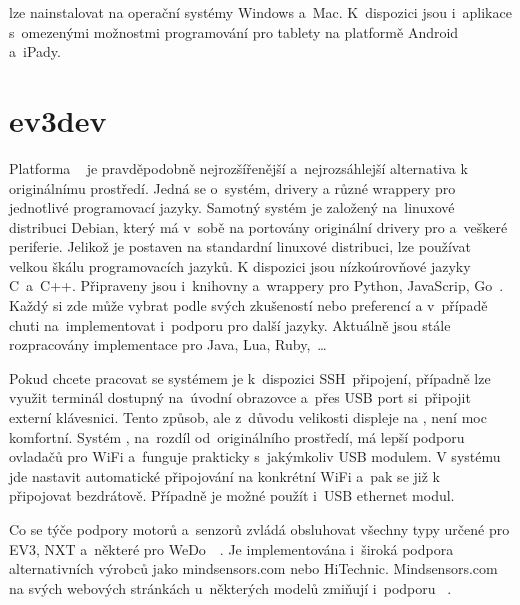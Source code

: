 \legoSW{} lze nainstalovat na operační systémy Windows a~Mac. K~dispozici jsou i~aplikace s~omezenými možnostmi programování pro tablety na platformě Android a~iPady.


\section{ev3dev}
\label{lego-ev3dev}

Platforma \evThreeDev{}~\cite{legoMindstormsEV3_ev3dev} je pravděpodobně nejrozšířenější a~nejrozsáhlejší alternativa k originálnímu \lego{} prostředí.
Jedná se o~systém, drivery a různé wrappery pro jednotlivé programovací jazyky. 
Samotný systém je založený na~linuxové distribuci Debian, který má v~sobě na portovány originální \lego{} drivery pro \EVbrick{} a~veškeré periferie.
Jelikož je \evThreeDev{} postaven na standardní linuxové distribuci, lze používat velkou škálu programovacích jazyků. 
K dispozici jsou nízkoúrovňové jazyky C~a~C++. 
Připraveny jsou i~knihovny a~wrappery pro Python, JavaScrip, Go~\cite{legoMindstormsEV3_ev3dev-prog-lang}. 
Každý si zde může vybrat podle svých zkušeností nebo preferencí a v~případě chuti na~implementovat i~podporu pro další jazyky. 
Aktuálně jsou stále rozpracovány implementace pro Java, Lua, Ruby,~\dots

Pokud chcete pracovat se systémem je k~dispozici SSH~připojení, případně lze využit terminál dostupný na~úvodní obrazovce a~přes USB port si~připojit externí klávesnici. 
Tento způsob, ale z~důvodu velikosti displeje na , není moc komfortní. 
Systém \evThreeDev{}, na~rozdíl od~originálního \lego{} prostředí, má lepší podporu ovladačů pro WiFi a~funguje prakticky s~jakýmkoliv USB modulem. 
V systému jde nastavit automatické připojování na konkrétní WiFi a~pak se již k~ připojovat bezdrátově.
Případně je možné použít i~USB ethernet modul.
 
Co se týče podpory \lego{} motorů a~senzorů \evThreeDev{} zvládá obsluhovat všechny typy určené pro EV3, NXT a~některé pro WeDo~\cite{legoMindstormsEV3_ev3dev-support-motors}~\cite{legoMindstormsEV3_ev3dev-support-sensors}.
Je implementována i~široká podpora alternativních výrobců jako mindsensors.com nebo HiTechnic. 
Mindsensors.com na svých webových stránkách u~některých modelů zmiňují i~podporu \evThreeDev{}~\cite{lego_mindsensor_gyro}.  

